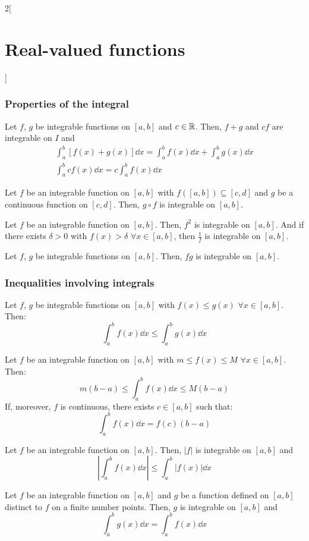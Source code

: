 \documentclass[../../../main.tex]{subfiles}
\begin{document}
\begin{multicols}{2}[\section{Real-valued functions}]
    \subsubsection*{Properties of the integral}
    \begin{prop}
        Let $f$, $g$ be integrable functions on $[a,b]$ and $c\in\mathbb{R}$. Then, $f+g$ and $cf$ are integrable on $I$ and
        \begin{gather*}
            \int_a^b[f(x)+g(x)]\dd x=\int_a^bf(x)\dd x+\int_a^bg(x)\dd x\\ \int_a^bcf(x)\dd x=c\int_a^bf(x)\dd x
        \end{gather*}
    \end{prop}
    \begin{theorem}
        Let $f$ be an integrable function on $[a,b]$ with $f([a,b])\subseteq[c,d]$ and $g$ be a continuous function on $[c,d]$. Then, $g\circ f$ is integrable on $[a,b]$.
    \end{theorem}
    \begin{corollary}
        Let $f$ be an integrable function on $[a,b]$. Then, $f^2$ is integrable on $[a,b]$. And if there exists $\delta>0$ with $f(x)>\delta$ $\forall x\in [a,b]$, then $\frac{1}{f}$ is integrable on $[a,b]$.
    \end{corollary}
    \begin{corollary}
        Let $f$, $g$ be integrable functions on $[a,b]$. Then, $fg$ is integrable on $[a,b]$.
    \end{corollary}
    \subsubsection*{Inequalities involving integrals}
    \begin{prop}
        Let $f$, $g$ be integrable functions on $[a,b]$ with $f(x)\leq g(x)$ $\forall x\in [a,b]$. Then: $$\int_a^bf(x)\dd x\leq\int_a^bg(x)\dd x$$
    \end{prop}
    \begin{corollary}
        Let $f$ be an integrable function on $[a,b]$ with $m\leq f(x)\leq M$ $\forall x\in [a,b]$. Then: $$m(b-a)\leq\int_a^bf(x)\dd x\leq M(b-a)$$ If, moreover, $f$ is continuous, there exists $c\in[a,b]$ such that: $$\int_a^bf(x)\dd x=f(c)(b-a)$$
    \end{corollary}
    \begin{prop}
        Let $f$ be an integrable function on $[a,b]$. Then, $|f|$ is integrable on $[a,b]$ and $$\left|\int_a^bf(x)\dd x\right|\leq\int_a^b|f(x)|\dd x$$
    \end{prop}
    \begin{prop}
        Let $f$ be an integrable function on $[a,b]$ and $g$ be a function defined on $[a,b]$ distinct to $f$ on a finite number points. Then, $g$ is integrable on $[a,b]$ and $$\int_a^bg(x)\dd x=\int_a^bf(x)\dd x$$
    \end{prop}

\end{multicols}
\end{document}
